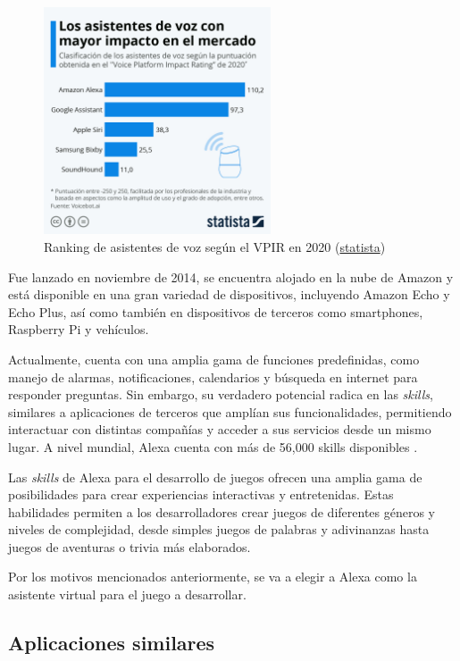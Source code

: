 \begin{figure}[ht]
    \centering
    \includegraphics[width=0.6\textwidth]{imgs/grafico-asistentes.jpeg}
    \caption{Ranking de asistentes de voz según el VPIR en 2020 (\href{https://es.statista.com/grafico/22578/clasificacion-de-los-asistentes-de-voz/}{statista})}
    \label{fig:grafico-asistentes}
\end{figure}

Fue lanzado en noviembre de 2014, se encuentra alojado en la nube de Amazon y está disponible en una gran variedad de dispositivos, incluyendo Amazon Echo y Echo Plus, así como también en dispositivos de terceros como smartphones, Raspberry Pi y vehículos.

Actualmente, cuenta con una amplia gama de funciones predefinidas, como manejo de alarmas, notificaciones, calendarios y búsqueda en internet para responder preguntas. Sin embargo, su verdadero potencial radica en las \textit{skills}, similares a aplicaciones de terceros que amplían sus funcionalidades, permitiendo interactuar con distintas compañías y acceder a sus servicios desde un mismo lugar. A nivel mundial, Alexa cuenta con más de 56,000 skills disponibles \parencite{tfgAlexa2}.

Las \textit{skills} de Alexa para el desarrollo de juegos ofrecen una amplia gama de posibilidades para crear experiencias interactivas y entretenidas. Estas habilidades permiten a los desarrolladores crear juegos de diferentes géneros y niveles de complejidad, desde simples juegos de palabras y adivinanzas hasta juegos de aventuras o trivia más elaborados.

Por los motivos mencionados anteriormente, se va a elegir a Alexa como la asistente virtual para el juego a desarrollar.

\subsection{Aplicaciones similares}

